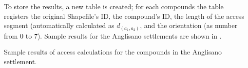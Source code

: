                 To store the results, a new table is created; for each compounds the table registers the original Shapefile's ID, the compound's ID, the length of the access segment (automatically calculated as $d_{(a_1, a_2)}$, and the orientation (as number from $0$ to $7$). Sample results for the Anglisano settlements are shown in .
                \begin{table}
                    \centering
                    
                    \caption[Sample results of access calculations for the compounds in the Anglisano settlement.]{Sample results of access calculations for the compounds in the Anglisano settlement.}
                    \label{tab:tab-access-anglisano}
                \end{table}

